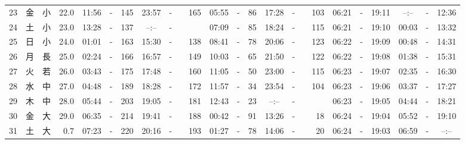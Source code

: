 \documentclass[12pt,a4j]{jsarticle}
\begin{document}
\begin{table}[htbp]
\begin{center}
{\begin{tabular}{|rc|cr|ccrccr|ccrccr|ccc|ccc|}
23 & 金 & 小 & 22.0 &  11:56 &-& 145 &  23:57 &-& 165 &  05:55 &-&  86 &  17:28 &-& 103 & 06:21 & -& 19:11 & --:-- & -& 12:36 \\
24 & 土 & 小 & 23.0 &  13:28 &-& 137 &  --:-- &-&~~~~~ &  07:09 &-&  85 &  18:24 &-& 115 & 06:21 & -& 19:10 & 00:03 & -& 13:32 \\
25 & 日 & 小 & 24.0 &  01:01 &-& 163 &  15:30 &-& 138 &  08:41 &-&  78 &  20:06 &-& 123 & 06:22 & -& 19:09 & 00:48 & -& 14:31 \\
26 & 月 & 長 & 25.0 &  02:24 &-& 166 &  16:57 &-& 149 &  10:03 &-&  65 &  21:50 &-& 122 & 06:22 & -& 19:08 & 01:38 & -& 15:31 \\
27 & 火 & 若 & 26.0 &  03:43 &-& 175 &  17:48 &-& 160 &  11:05 &-&  50 &  23:00 &-& 115 & 06:23 & -& 19:07 & 02:35 & -& 16:30 \\
28 & 水 & 中 & 27.0 &  04:48 &-& 189 &  18:28 &-& 172 &  11:57 &-&  34 &  23:54 &-& 104 & 06:23 & -& 19:06 & 03:37 & -& 17:27 \\
29 & 木 & 中 & 28.0 &  05:44 &-& 203 &  19:05 &-& 181 &  12:43 &-&  23 &  --:-- &-&~~~~~ & 06:23 & -& 19:05 & 04:44 & -& 18:21 \\
30 & 金 & 大 & 29.0 &  06:35 &-& 214 &  19:41 &-& 188 &  00:42 &-&  91 &  13:26 &-&  18 & 06:24 & -& 19:04 & 05:52 & -& 19:10 \\
31 & 土 & 大 &  0.7 &  07:23 &-& 220 &  20:16 &-& 193 &  01:27 &-&  78 &  14:06 &-&  20 & 06:24 & -& 19:03 & 06:59 & -& --:-- \\
   \hline
   \end{tabular}}
   \end{center}
\end{table}
\newpage
\end{document}
